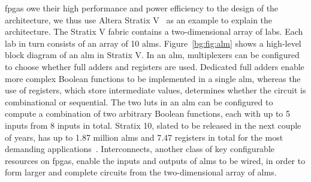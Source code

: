 \Glspl{fpga} owe their high performance and power efficiency to the design
of the architecture, we thus use Altera Stratix V~\cite{stratix5} as an
example to explain the architecture.  The Stratix V fabric contains a
two-dimensional array of \glspl{lab}.  Each \gls{lab} in turn consists of an
array of 10 \glspl{alm}.  Figure~\ref{bg:fig:alm} shows a high-level block
diagram of an \gls{alm} in Stratix V.  In an \gls{alm}, multiplexers can be
configured to choose whether full adders and registers are used.  Dedicated
full adders enable more complex Boolean functions to be implemented in a
single \gls{alm}, whereas the use of registers, which store intermediate
values, determines whether the circuit is combinational or sequential.  The
two \glspl{lut} in an \gls{alm} can be configured to compute a combination
of two arbitrary Boolean functions, each with up to 5 inputs from 8 inputs
in total.  Stratix 10, slated to be released in the next couple of years,
has up to 1.87 million \glspl{alm} and 7.47 registers in total for the most
demanding applications~\cite{stratix10stat}.  Interconnects, another class of
key configurable resources on \glspl{fpga}, enable the inputs and outputs of
\glspl{alm} to be wired, in order to form larger and complete circuits from the
two-dimensional array of \glspl{alm}.
